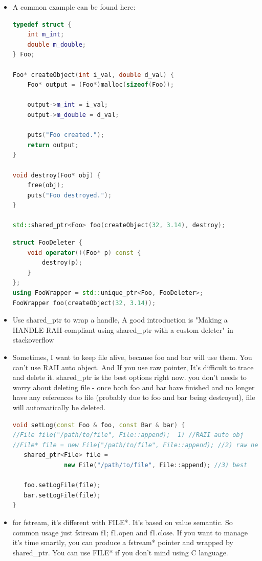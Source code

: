 \documentclass[a4paper,12pt,twoside]{book}
\begin{document}
\begin{itemize}
\item A common example can be found here:
\begin{lstlisting}[frame=single, language=c++]
typedef struct {
    int m_int;
    double m_double;
} Foo;

Foo* createObject(int i_val, double d_val) {
    Foo* output = (Foo*)malloc(sizeof(Foo));

    output->m_int = i_val;
    output->m_double = d_val;

    puts("Foo created.");
    return output;
}

void destroy(Foo* obj) {
    free(obj);
    puts("Foo destroyed.");        
}

std::shared_ptr<Foo> foo(createObject(32, 3.14), destroy);
\end{lstlisting}

\begin{lstlisting}[frame=single, language=c++]
struct FooDeleter {
    void operator()(Foo* p) const {
        destroy(p);
    }
};
using FooWrapper = std::unique_ptr<Foo, FooDeleter>;
FooWrapper foo(createObject(32, 3.14));
\end{lstlisting}

\item Use shared\_ptr to wrap a handle, A good introduction is "Making a HANDLE RAII-compliant using shared\_ptr with a custom deleter" in stackoverflow


\item Sometimes, I want to keep file alive, because foo and bar will use them. You can't use RAII auto object. And If you use raw pointer, It's difficult to trace and delete it. shared\_ptr is the best options right now.  you don't needs to worry about deleting file - once both foo and bar have finished and no longer have any references to file (probably due to foo and bar being destroyed), file will automatically be deleted.

\begin{lstlisting}[frame=single, language=c++]
void setLog(const Foo & foo, const Bar & bar) {
//File file("/path/to/file", File::append);  1) //RAII auto obj
//File* file = new File("/path/to/file", File::append); //2) raw new
   shared_ptr<File> file =
              new File("/path/to/file", File::append); //3) best
              
   foo.setLogFile(file);
   bar.setLogFile(file);
}
\end{lstlisting}

\item for fstream, it's different with FILE*. It's based on value semantic. So common usage just fstream f1; f1.open and f1.close. If you want to manage it's time smartly, you can produce a fstream* pointer and wrapped by shared\_ptr. You can use FILE* if you don't mind using C language.


\end{itemize}
\end{document}
